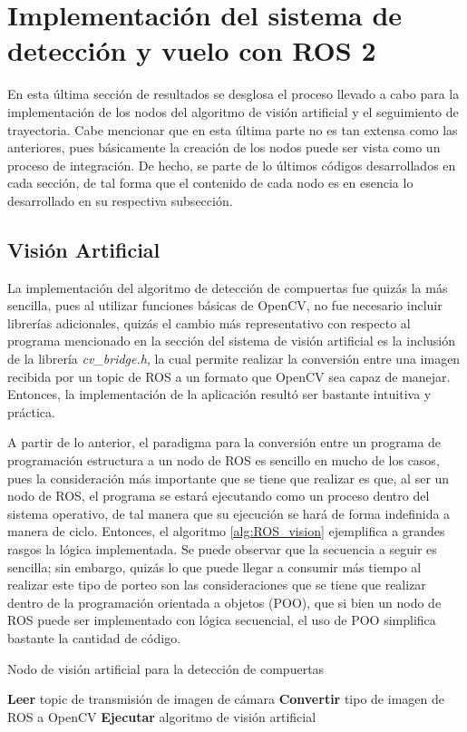 \chapter{Implementación del sistema de detección y vuelo con ROS 2}

En esta última sección de resultados se desglosa el proceso llevado a cabo para la implementación de los nodos del algoritmo de visión artificial y el seguimiento de trayectoria. Cabe mencionar que en esta última parte no es tan extensa como las anteriores, pues básicamente la creación de los nodos puede ser vista como un proceso de integración. De hecho, se parte de lo últimos códigos desarrollados en cada sección, de tal forma que el contenido de cada nodo es en esencia lo desarrollado en su respectiva subsección.

\section{Visión Artificial}
La implementación del algoritmo de detección de compuertas fue quizás la más sencilla, pues al utilizar funciones básicas de OpenCV, no fue necesario incluir librerías adicionales, quizás el cambio más representativo con respecto al programa mencionado en la sección del sistema de visión artificial es la inclusión de la librería \textit{cv\_bridge.h}, la cual permite realizar la conversión entre una imagen recibida por un topic de ROS a un formato que OpenCV sea capaz de manejar. Entonces, la implementación de la aplicación resultó ser bastante intuitiva y práctica.

A partir de lo anterior, el paradigma para la conversión entre un programa de programación estructura a un nodo de ROS es sencillo en mucho de los casos, pues la consideración más importante que se tiene que realizar es que, al ser un nodo de ROS, el programa se estará ejecutando como un proceso dentro del sistema operativo, de tal manera que su ejecución se hará de forma indefinida a manera de ciclo. Entonces, el algoritmo \ref{alg:ROS_vision} ejemplifica a grandes rasgos la lógica implementada. Se puede observar que la secuencia a seguir es sencilla; sin embargo, quizás lo que puede llegar a consumir más tiempo al realizar este tipo de porteo son las consideraciones que se tiene que realizar dentro de la programación orientada a objetos (POO), que si bien un nodo de ROS puede ser implementado con lógica secuencial, el uso de POO simplifica bastante la cantidad de código.


\begin{algorithm}
    \caption{Nodo de visión artificial para la detección de compuertas}\label{alg:ROS_vision}
    \begin{algorithmic}
    \State \textbf{Leer} topic de transmisión de imagen de cámara
    \State \textbf{Convertir} tipo de imagen de ROS a OpenCV
    \State \textbf{Ejecutar} algoritmo de visión artificial
    \EndWhile
\end{algorithmic}
\end{algorithm}

